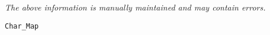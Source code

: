 \label{pkg:char\_map}

{\tiny \it The above information is manually maintained and may contain errors.}
\begin{verbatim}
Char_Map
\end{verbatim}

